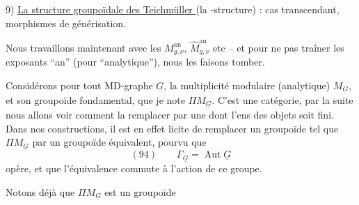 9) \uline{La structure groupoïdale des  Teichmüller } (la -structure) : cas transcendant, morphismes de générisation.

Nous travaillons maintenant avec les $M^{\mathrm{an}}_{g,\nu}$, $\widehat M^{\mathrm{an}}_{g,\nu}$ etc -- et pour ne pas traîner les exposants ``an'' (pour ``analytique''), nous les faisons tomber.

Considérons pour tout MD-graphe $\underline G$, la multiplicité modulaire (analytique) $M_{\underline G}$, et son groupoïde fondamental, que je note $\Pi M_{\underline G}$. C'est une  catégorie, par la suite nous allons voir comment la remplacer  par une   dont l'ens des objets soit fini. Dans nos constructions, il est en effet licite de remplacer un groupoïde tel que $\Pi M_{\underline G}$ par un groupoïde équivalent, pourvu que    
\[
(94)\qquad \Gamma_{\underline G}=\operatorname{Aut}\underline G
\]
opère, et que l'équivalence commute à l'action de ce groupe.

Notons déjà que $\Pi M_{\underline G}$ est un groupoïde
